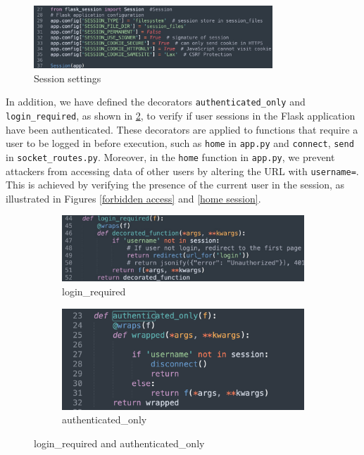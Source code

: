 \documentclass[12pt]{article}
\begin{document}
        \begin{figure}[H]
            \centering
            \includegraphics[width=0.8\textwidth]{graphs/session_settings.jpg}
            \caption{Session settings}
            \label{Session setting}
        \end{figure}

        In addition, we have defined the decorators \texttt{authenticated\_only} and \texttt{login\_required}, as shown in \ref{wrappers}, to verify if user sessions in the Flask application have been authenticated. These decorators are applied to functions that require a user to be logged in before execution, such as \texttt{home} in \texttt{app.py} and \texttt{connect}, \texttt{send} in \texttt{socket\_routes.py}. Moreover, in the \texttt{home} function in \texttt{app.py}, we prevent attackers from accessing data of other users by altering the URL with \texttt{username=}. This is achieved by verifying the presence of the current user in the session, as illustrated in Figures \ref{forbidden access} and \ref{home session}.

        
        \begin{figure}[H]
            \centering
            \begin{subfigure}[b]{0.75\textwidth}
                \centering
                \includegraphics[width=\textwidth]{graphs/login_required.jpg}
                \caption{login\_required}
            \end{subfigure}
            \hfill 
            \begin{subfigure}[b]{0.75\textwidth}
                \centering
                \includegraphics[width=\textwidth]{graphs/authenticated_only.jpg}
                \caption{authenticated\_only}
            \end{subfigure}
            \caption{login\_required and authenticated\_only}
            \label{wrappers}
        \end{figure}
\end{document}
